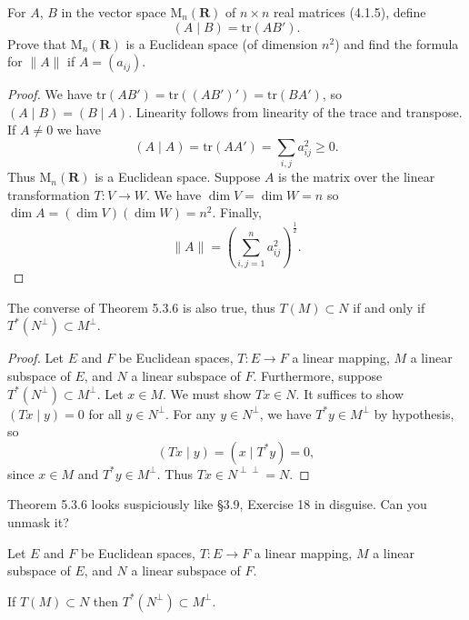 \begin{tcolorbox}[title=Problem 4, breakable]
For $A$, $B$ in the vector space $\mathrm{M}_n(\mathbf{R})$ of $n \times n$ real matrices (4.1.5), define
\[
    (A \mid B) = \mathrm{tr}(AB').
\]
Prove that $\mathrm{M}_n(\mathbf{R})$ is a Euclidean space (of dimension $n^2$) and find the formula for $\|A\|$ if $A = (a_{ij})$.
\end{tcolorbox}

\begin{proof}
    We have $\mathrm{tr}(AB') = \mathrm{tr}((AB')') = \mathrm{tr}(BA')$, 
        so $(A\mid B) = (B\mid A)$. 
    Linearity follows from linearity of the trace and transpose. 
    If $A \ne 0$ we have
    \[(A \mid A) = \mathrm{tr}(AA') = \sum_{i,j} a_{ij}^2 \geq 0.\]
    Thus $\mathrm{M}_n(\mathbf{R})$ is a Euclidean space. 
    Suppose $A$ is the matrix over the linear transformation $T : V \longrightarrow W$.
    We have $\dim V = \dim W = n$ so $\dim A = (\dim V)(\dim W) = n^2$. Finally,
    \[\|A\| = \left(\sum_{i,j=1}^n a_{ij}^2\right)^{\frac{1}{2}}.\]
\end{proof}

\begin{tcolorbox}[title=Problem 5, breakable]
The converse of Theorem 5.3.6 is also true, thus $T(M) \subset N$ if and only if $T^*(N^\perp) \subset M^\perp$.
\end{tcolorbox}

\begin{proof}
    Let $E$ and $F$ be Euclidean spaces, $T: E \to F$ a linear mapping,
    $M$ a linear subspace of $E$, and $N$ a linear subspace of $F$.
    Furthermore, suppose $T^*(N^\perp) \subset M^\perp$.
    Let $x \in M$. We must show $Tx \in N$.
    It suffices to show $(Tx \mid y) = 0$ for all $y \in N^\perp$.
    For any $y \in N^\perp$, we have $T^*y \in M^\perp$ by hypothesis, so
    \[(Tx \mid y) = (x \mid T^*y) = 0,\]
    since $x \in M$ and $T^*y \in M^\perp$. Thus $Tx \in N^{\perp\perp} = N$.
\end{proof}


\begin{tcolorbox}[title=Problem 6, breakable]
Theorem 5.3.6 looks suspiciously like \S3.9, Exercise 18 in disguise. Can you unmask it?
\end{tcolorbox}

\begin{theorem}[Theorem 5.3.6]
    Let $E$ and $F$ be Euclidean spaces, $T : E \longrightarrow F$
    a linear mapping, $M$ a linear subspace of $E$, and $N$ a linear subspace 
    of $F$. 

    If $T(M) \subset N$ then $T^*(N^\perp) \subset M^\perp$.
\end{theorem}

